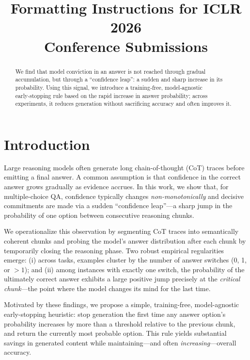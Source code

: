 \documentclass{article}
\title{Formatting Instructions for ICLR 2026 \\ Conference Submissions}
\begin{document}
\maketitle

\begin{abstract}
We find that model conviction in an answer is not reached through gradual accumulation, but through a ``confidence leap'': a sudden and sharp increase in its probability. Using this signal, we introduce a training‑free, model‑agnostic early‑stopping rule based on the rapid increase in answer probability; across experiments, it reduces generation without sacrificing accuracy and often improves it. 

\end{abstract}

\section{Introduction}
\label{sec:introduction}

Large reasoning models often generate long chain-of-thought (CoT) traces before emitting a final answer. A common assumption is that confidence in the correct answer grows gradually as evidence accrues. In this work, we show that, for multiple-choice QA, confidence typically changes \emph{non-monotonically} and decisive commitments are made via a sudden ``confidence leap''—a sharp jump in the probability of one option between consecutive reasoning chunks.

We operationalize this observation by segmenting CoT traces into semantically coherent chunks and probing the model’s answer distribution after each chunk by temporarily closing the reasoning phase. Two robust empirical regularities emerge: (i) across tasks, examples cluster by the number of answer switches (0, 1, or $>1$); and (ii) among instances with exactly one switch, the probability of the ultimately correct answer exhibits a large positive jump precisely at the \emph{critical chunk}—the point where the model changes its mind for the last time.

Motivated by these findings, we propose a simple, training-free, model-agnostic early-stopping heuristic: stop generation the first time any answer option’s probability increases by more than a threshold relative to the previous chunk, and return the currently most probable option. This rule yields substantial savings in generated content while maintaining—and often \emph{increasing}—overall accuracy.
\end{document}
